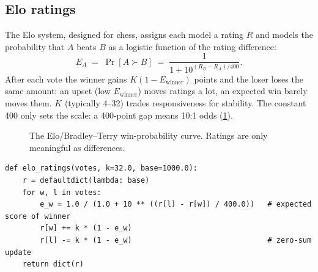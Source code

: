 \subsection{Elo ratings}
The Elo system, designed for chess, assigns each model a rating $R$ and models the probability that
$A$ beats $B$ as a logistic function of the rating difference:
\begin{equation}
  E_A \;=\; \Pr[A \succ B] \;=\; \frac{1}{1 + 10^{(R_B - R_A)/400}}.
  \label{eq:eval:elo}
\end{equation}
After each vote the winner gains $K(1 - E_{\text{winner}})$ points and the loser loses the same
amount: an upset (low $E_{\text{winner}}$) moves ratings a lot, an expected win barely moves them.
$K$ (typically 4--32) trades responsiveness for stability. The constant 400 only sets the scale:
a 400-point gap means 10:1 odds (\cref{fig:eval:elo}).

\begin{figure}[t]
\centering
{}
\caption{The Elo/Bradley--Terry win-probability curve. Ratings are only meaningful as
differences.}
\label{fig:eval:elo}
\end{figure}

\begin{lstlisting}[caption={Online Elo from (winner, loser) votes.},label={lst:eval:elo}]
def elo_ratings(votes, k=32.0, base=1000.0):
    r = defaultdict(lambda: base)
    for w, l in votes:
        e_w = 1.0 / (1.0 + 10 ** ((r[l] - r[w]) / 400.0))   # expected score of winner
        r[w] += k * (1 - e_w)
        r[l] -= k * (1 - e_w)                               # zero-sum update
    return dict(r)
\end{lstlisting}

